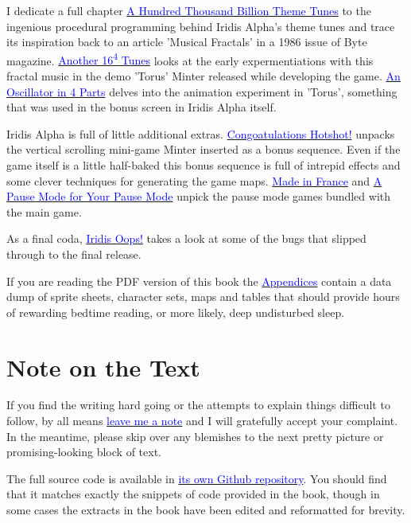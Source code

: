 I dedicate a full chapter \hyperref[sec:first16]{\textcolor{blue}{A Hundred Thousand Billion Theme Tunes}} to the ingenious procedural programming behind Iridis Alpha's theme
tunes and trace its inspiration back to an article 'Musical Fractals' in a 1986 issue of Byte magazine. \hyperref[sec:torusmusic]{\textcolor{blue}{Another 16\textsuperscript{4} Tunes}} looks
at the early expermentiations with this fractal music in the demo 'Torus' Minter released while developing the game. \hyperref[sec:torus]{\textcolor{blue}{An Oscillator in 4 Parts}} delves
into the animation experiment in 'Torus', something that was used in the bonus screen in Iridis Alpha itself.

Iridis Alpha is full of little additional extras. \hyperref[sec:bonus]{\textcolor{blue}{Congoatulations Hotshot!}} unpacks the vertical
scrolling mini-game Minter inserted as a bonus sequence. Even if the game itself is a little half-baked this bonus sequence is full of intrepid effects and some clever techniques
for generating the game maps. \hyperref[sec:mif]{\textcolor{blue}{Made in France}} and \hyperref[sec:dna]{\textcolor{blue}{A Pause Mode for Your Pause Mode}} unpick the pause mode games
bundled with the main game.

As a final coda, \hyperref[sec:bugs]{\textcolor{blue}{Iridis Oops!}} takes a look at some of the bugs that slipped through to the final release. 

If you are reading the PDF version of this book the \hyperref[sec:appendices]{\textcolor{blue}{Appendices}} contain a data dump of sprite sheets, character sets, maps and tables that 
should provide hours of rewarding bedtime reading, or more likely, deep undisturbed sleep.

\section*{Note on the Text}
If you find the writing hard going or the attempts to explain things difficult
to follow, by all means \href{https://github.com/mwenge/iatheory/issues}{\textcolor{blue}{leave me a note}} and
I will gratefully accept your complaint. In the meantime, please skip over any blemishes
to the next pretty picture or promising-looking block of text.

The full source code is available in \href{https://github.com/mwenge/iridisalpha}{\textcolor{blue}{its own Github repository}}. 
You should find that it matches exactly the snippets of code provided in the book, though in some cases the extracts in the book have been edited
and reformatted for brevity.


